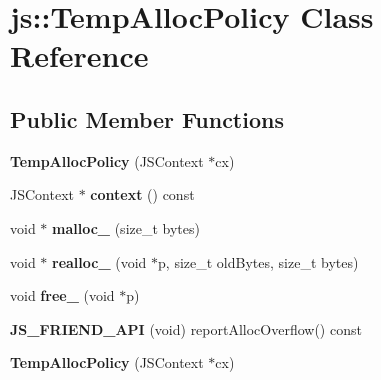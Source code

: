 \hypertarget{classjs_1_1_temp_alloc_policy}{\section{js\-:\-:Temp\-Alloc\-Policy Class Reference}
\label{classjs_1_1_temp_alloc_policy}
}
\subsection*{Public Member Functions}
\begin{DoxyCompactItemize}
\item 
\hypertarget{classjs_1_1_temp_alloc_policy_a8443fa5a9b89e16654fc798277f0306f}{{\bfseries Temp\-Alloc\-Policy} (J\-S\-Context $\ast$cx)}\label{classjs_1_1_temp_alloc_policy_a8443fa5a9b89e16654fc798277f0306f}

\item 
\hypertarget{classjs_1_1_temp_alloc_policy_a9bbea079978c541aaf2ade7eece363af}{J\-S\-Context $\ast$ {\bfseries context} () const }\label{classjs_1_1_temp_alloc_policy_a9bbea079978c541aaf2ade7eece363af}

\item 
\hypertarget{classjs_1_1_temp_alloc_policy_abb57d5d7c2f5381be7fefe591d72915b}{void $\ast$ {\bfseries malloc\-\_\-} (size\-\_\-t bytes)}\label{classjs_1_1_temp_alloc_policy_abb57d5d7c2f5381be7fefe591d72915b}

\item 
\hypertarget{classjs_1_1_temp_alloc_policy_ab2ffd5a8a399c4612c4dd43640a407d1}{void $\ast$ {\bfseries realloc\-\_\-} (void $\ast$p, size\-\_\-t old\-Bytes, size\-\_\-t bytes)}\label{classjs_1_1_temp_alloc_policy_ab2ffd5a8a399c4612c4dd43640a407d1}

\item 
\hypertarget{classjs_1_1_temp_alloc_policy_a7a8a1198f28fb2e7294f010ed51be0a9}{void {\bfseries free\-\_\-} (void $\ast$p)}\label{classjs_1_1_temp_alloc_policy_a7a8a1198f28fb2e7294f010ed51be0a9}

\item 
\hypertarget{classjs_1_1_temp_alloc_policy_a3ebc04ae8de613e349ae687914318a5c}{{\bfseries J\-S\-\_\-\-F\-R\-I\-E\-N\-D\-\_\-\-A\-P\-I} (void) report\-Alloc\-Overflow() const }\label{classjs_1_1_temp_alloc_policy_a3ebc04ae8de613e349ae687914318a5c}

\item 
\hypertarget{classjs_1_1_temp_alloc_policy_a8443fa5a9b89e16654fc798277f0306f}{{\bfseries Temp\-Alloc\-Policy} (J\-S\-Context $\ast$cx)}\label{classjs_1_1_temp_alloc_policy_a8443fa5a9b89e16654fc798277f0306f}


\end{DoxyCompactItemize}
